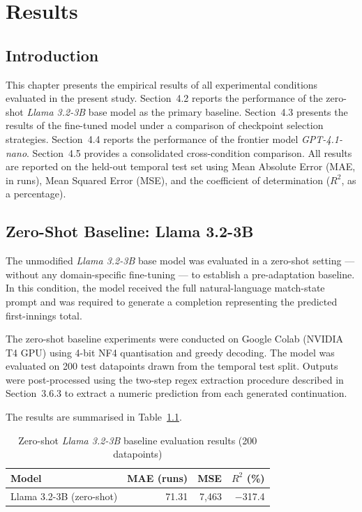 \chapter{Results}

\section{Introduction}

This chapter presents the empirical results of all experimental conditions evaluated in the present study. Section~4.2 reports the performance of the zero-shot \textit{Llama 3.2-3B} base model as the primary baseline. Section~4.3 presents the results of the fine-tuned model under a comparison of checkpoint selection strategies. Section~4.4 reports the performance of the frontier model \textit{GPT-4.1-nano}. Section~4.5 provides a consolidated cross-condition comparison. All results are reported on the held-out temporal test set using Mean Absolute Error (MAE, in runs), Mean Squared Error (MSE), and the coefficient of determination ($R^2$, as a percentage).

\section{Zero-Shot Baseline: Llama 3.2-3B}

The unmodified \textit{Llama 3.2-3B} base model was evaluated in a zero-shot setting --- without any domain-specific fine-tuning --- to establish a pre-adaptation baseline. In this condition, the model received the full natural-language match-state prompt and was required to generate a completion representing the predicted first-innings total.

The zero-shot baseline experiments were conducted on Google Colab (NVIDIA T4 GPU) using 4-bit NF4 quantisation and greedy decoding. The model was evaluated on 200 test datapoints drawn from the temporal test split. Outputs were post-processed using the two-step regex extraction procedure described in Section~3.6.3 to extract a numeric prediction from each generated continuation.

The results are summarised in Table~\ref{tab:zeroshot_results}.

\begin{table}[ht]
\centering
\caption{Zero-shot \textit{Llama 3.2-3B} baseline evaluation results (200 datapoints)}
\label{tab:zeroshot_results}
\begin{tabular}{lrrr}
\hline
\textbf{Model} & \textbf{MAE (runs)} & \textbf{MSE} & \textbf{$R^2$ (\%)} \\
\hline
Llama 3.2-3B (zero-shot) & 71.31 & 7,463 & $-$317.4 \\
\hline
\end{tabular}
\end{table}

